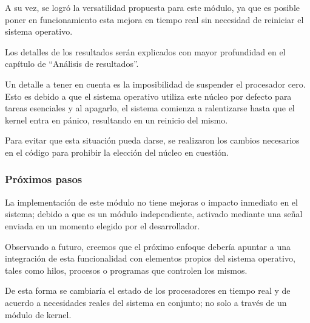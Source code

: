 A su vez, se logró la versatilidad propuesta para este módulo, ya que es posible poner en funcionamiento esta mejora en tiempo real sin necesidad de reiniciar el sistema operativo.\par

Los detalles de los resultados serán explicados con mayor profundidad en el capítulo de
“Análisis de resultados”.\par

Un detalle a tener en cuenta es la imposibilidad de suspender el procesador cero. Esto es debido a que el sistema operativo utiliza este núcleo por defecto para tareas esenciales y al apagarlo, el sistema comienza a ralentizarse hasta que el kernel entra en pánico, resultando en un reinicio del mismo.\par

Para evitar que esta situación pueda darse, se realizaron los cambios necesarios en el código para prohibir la elección del núcleo en cuestión.\par


\subsubsection{Próximos pasos}

La implementación de este módulo no tiene mejoras o impacto inmediato en el sistema;  debido a que es un módulo independiente, activado mediante una señal enviada en un momento elegido por el desarrollador.\par

Observando a futuro, creemos que el próximo enfoque debería apuntar a una integración de esta funcionalidad con elementos propios del sistema operativo, tales como hilos, procesos o programas que controlen los mismos.\par

De esta forma se cambiaría el estado de los procesadores en tiempo real y de acuerdo a necesidades reales del sistema en conjunto; no solo a través de un módulo de kernel.\par
